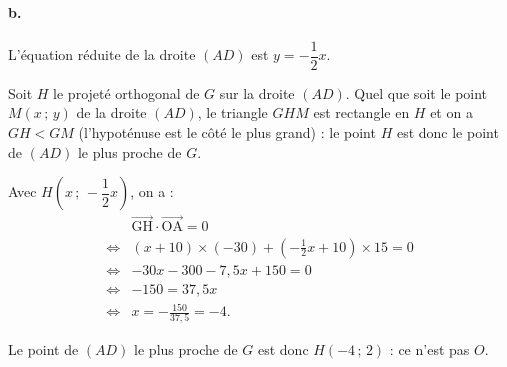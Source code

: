 \paragraph{b.} L'équation réduite de la droite \((AD)\) est \( y = -\dfrac{1}{2}x \).

Soit \(H\) le projeté orthogonal de \(G\) sur la droite \((AD)\). Quel que soit le point \(M(x\,;\,y)\) de la droite \((AD)\), le triangle \(GHM\) est rectangle en \(H\) et on a \(GH < GM\) (l'hypoténuse est le côté le plus grand) : le point \(H\) est donc le point de \((AD)\) le plus proche de \(G\).

Avec \(H(x\,;\,-\dfrac{1}{2}x)\), on a :
\begin{align*}
&\overrightarrow{\text{GH}} \cdot \overrightarrow{\text{OA}} = 0 \\
\iff &(x + 10) \times (-30) + \left( -\frac{1}{2}x + 10 \right) \times 15 = 0 \\
\iff &-30x - 300 - 7{,}5x + 150 = 0 \\
\iff &-150 = 37{,}5x \\
\iff &x = -\frac{150}{37{,}5} = -4.
\end{align*}

Le point de \( (AD) \) le plus proche de \( G \) est donc \( H(-4 \,;\, 2) \) : ce n'est pas \( O \).
